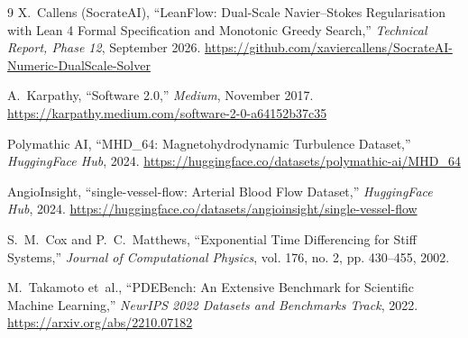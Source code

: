 \documentclass[10pt,twocolumn]{article}
\begin{document}
\begin{thebibliography}{9}
X.~Callens (SocrateAI), ``LeanFlow: Dual-Scale Navier--Stokes Regularisation
with Lean 4 Formal Specification and Monotonic Greedy Search,''
\textit{Technical Report, Phase 12}, September 2026.
\url{https://github.com/xaviercallens/SocrateAI-Numeric-DualScale-Solver}

A.~Karpathy, ``Software 2.0,'' \textit{Medium}, November 2017.
\url{https://karpathy.medium.com/software-2-0-a64152b37c35}

Polymathic AI, ``MHD\_64: Magnetohydrodynamic Turbulence Dataset,''
\textit{HuggingFace Hub}, 2024.
\url{https://huggingface.co/datasets/polymathic-ai/MHD_64}

AngioInsight, ``single-vessel-flow: Arterial Blood Flow Dataset,''
\textit{HuggingFace Hub}, 2024.
\url{https://huggingface.co/datasets/angioinsight/single-vessel-flow}

S.~M.~Cox and P.~C.~Matthews, ``Exponential Time Differencing for Stiff Systems,''
\textit{Journal of Computational Physics}, vol. 176, no. 2, pp. 430--455, 2002.

M.~Takamoto et~al., ``PDEBench: An Extensive Benchmark for Scientific
Machine Learning,'' \textit{NeurIPS 2022 Datasets and Benchmarks Track}, 2022.
\url{https://arxiv.org/abs/2210.07182}
\end{thebibliography}
\end{document}

